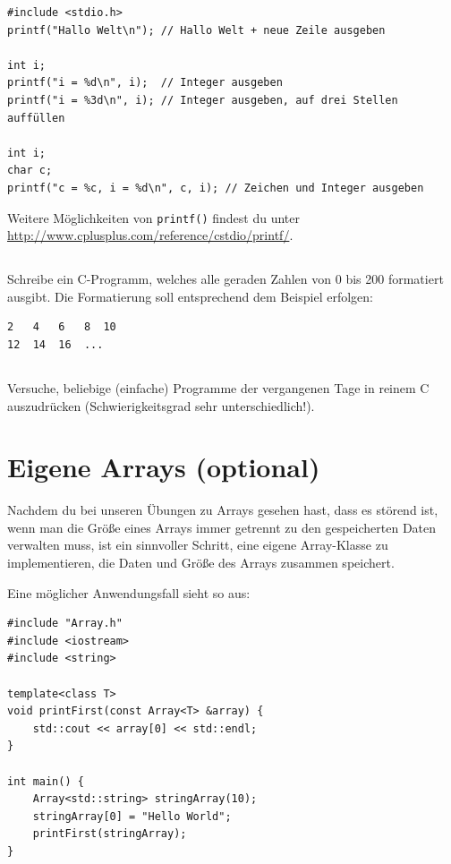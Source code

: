 \begin{lstlisting}
#include <stdio.h>
printf("Hallo Welt\n"); // Hallo Welt + neue Zeile ausgeben

int i;
printf("i = %d\n", i);  // Integer ausgeben
printf("i = %3d\n", i); // Integer ausgeben, auf drei Stellen auffüllen

int i;
char c;
printf("c = %c, i = %d\n", c, i); // Zeichen und Integer ausgeben
\end{lstlisting}

Weitere Möglichkeiten von \texttt{printf()} findest du unter \url{http://www.cplusplus.com/reference/cstdio/printf/}.

\subsection{}
Schreibe ein C-Programm, welches alle geraden Zahlen von 0 bis 200 formatiert ausgibt.
Die Formatierung soll entsprechend dem Beispiel erfolgen:

\begin{lstlisting}
2   4   6   8  10
12  14  16  ...
\end{lstlisting}

\subsection{}
Versuche, beliebige (einfache) Programme der vergangenen Tage in reinem C auszudrücken (Schwierigkeitsgrad sehr unterschiedlich!).



\newpage

\section{Eigene Arrays (optional)}
\label{sec:array}

Nachdem du bei unseren Übungen zu Arrays gesehen hast, dass es störend ist, wenn man die Größe eines Arrays immer getrennt zu den gespeicherten Daten verwalten muss, ist ein sinnvoller Schritt, eine eigene Array-Klasse zu implementieren, die Daten und Größe des Arrays zusammen speichert.

Eine möglicher Anwendungsfall sieht so aus:

\begin{lstlisting}
#include "Array.h"
#include <iostream>
#include <string>

template<class T>
void printFirst(const Array<T> &array) {
    std::cout << array[0] << std::endl;
}

int main() {
    Array<std::string> stringArray(10);
    stringArray[0] = "Hello World";
    printFirst(stringArray);
}
\end{lstlisting}

